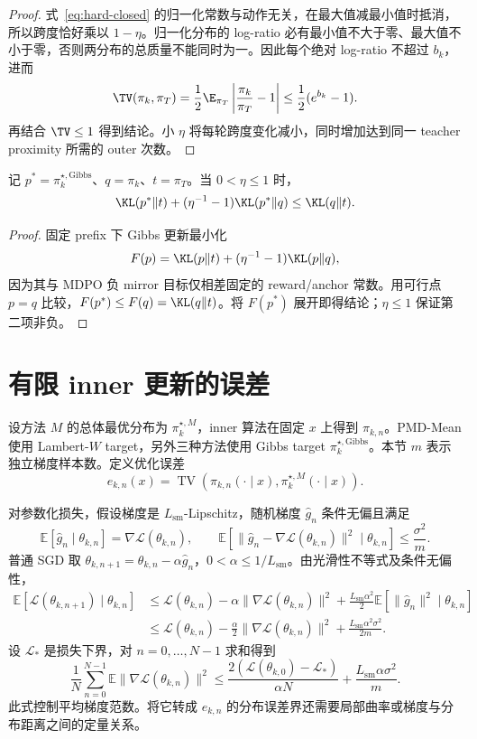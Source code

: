 \begin{proof}
式~\eqref{eq:hard-closed} 的归一化常数与动作无关，在最大值减最小值时抵消，所以跨度恰好乘以 $1-\eta$。归一化分布的 log-ratio 必有最小值不大于零、最大值不小于零，否则两分布的总质量不能同时为一。因此每个绝对 log-ratio 不超过 $b_k$，进而
\[
 \TV(\pi_k,\pi_T)
 =\frac12\E_{\pi_T}\left|\frac{\pi_k}{\pi_T}-1\right|
 \leq\frac12(e^{b_k}-1).
\]
再结合 $\TV\leq1$ 得到结论。小 $\eta$ 将每轮跨度变化减小，同时增加达到同一 teacher proximity 所需的 outer 次数。
\end{proof}

\begin{proposition}
记 $p^*=\pi_k^{\star,\mathrm{Gibbs}}$、$q=\pi_k$、$t=\pi_T$。当 $0<\eta\leq1$ 时，
\[
 \KL(p^*\Vert t)+(\eta^{-1}-1)\KL(p^*\Vert q)
 \leq\KL(q\Vert t).
\]
\end{proposition}

\begin{proof}
固定 prefix 下 Gibbs 更新最小化
\[
 F(p)=\KL(p\Vert t)+(\eta^{-1}-1)\KL(p\Vert q),
\]
因为其与 MDPO 负 mirror 目标仅相差固定的 reward/anchor 常数。用可行点 $p=q$ 比较，$F(p^*)\leq F(q)=\KL(q\Vert t)$。将 $F(p^*)$ 展开即得结论；$\eta\leq1$ 保证第二项非负。
\end{proof}



\section{有限 inner 更新的误差}

设方法 $M$ 的总体最优分布为 $\pi_k^{\star,M}$，inner 算法在固定 $x$ 上得到 $\pi_{k,n}$。PMD-Mean 使用 Lambert-$W$ target，另外三种方法使用 Gibbs target $\pi_k^{\star,\mathrm{Gibbs}}$。本节 $m$ 表示独立梯度样本数。定义优化误差
\[
e_{k,n}(x)=\operatorname{TV}\!\left(\pi_{k,n}(\cdot\mid x),\pi_k^{\star,M}(\cdot\mid x)\right).
\]

对参数化损失，假设梯度是 $L_{\mathrm{sm}}$-Lipschitz，随机梯度 $\widehat g_n$ 条件无偏且满足
\[
\mathbb E[\widehat g_n\mid\theta_{k,n}]=\nabla\mathcal L(\theta_{k,n}),\qquad
\mathbb E\!\left[\|\widehat g_n-\nabla\mathcal L(\theta_{k,n})\|^2\mid\theta_{k,n}\right]\le\frac{\sigma^2}{m}.
\]
普通 SGD 取 $\theta_{k,n+1}=\theta_{k,n}-\alpha\widehat g_n$，$0<\alpha\le 1/L_{\mathrm{sm}}$。由光滑性不等式及条件无偏性，
\begin{align*}
\mathbb E[\mathcal L(\theta_{k,n+1})\mid\theta_{k,n}]
&\le\mathcal L(\theta_{k,n})-\alpha\|\nabla\mathcal L(\theta_{k,n})\|^2
+\frac{L_{\mathrm{sm}}\alpha^2}{2}\mathbb E[\|\widehat g_n\|^2\mid\theta_{k,n}]\\
&\le\mathcal L(\theta_{k,n})-\frac\alpha2\|\nabla\mathcal L(\theta_{k,n})\|^2
+\frac{L_{\mathrm{sm}}\alpha^2\sigma^2}{2m}.
\end{align*}
设 $\mathcal L_*$ 是损失下界，对 $n=0,\ldots,N-1$ 求和得到
\[
\frac1N\sum_{n=0}^{N-1}\mathbb E\|\nabla\mathcal L(\theta_{k,n})\|^2
\le\frac{2(\mathcal L(\theta_{k,0})-\mathcal L_*)}{\alpha N}
+\frac{L_{\mathrm{sm}}\alpha\sigma^2}{m}.
\]
此式控制平均梯度范数。将它转成 $e_{k,n}$ 的分布误差界还需要局部曲率或梯度与分布距离之间的定量关系。

